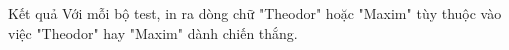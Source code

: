 Kết quả
Với mỗi bộ test, in ra dòng chữ "Theodor" hoặc "Maxim" tùy thuộc vào việc "Theodor" hay "Maxim" dành chiến thắng.
